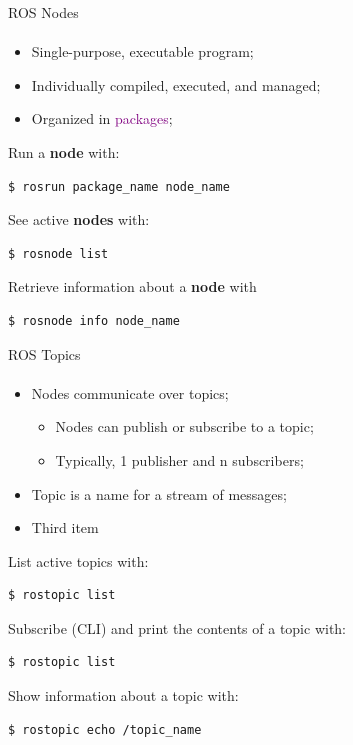 \documentclass[aspectratio=169]{beamer}
\begin{document}
\begin{frame}[fragile]{ROS Nodes}
	\framesubtitle{ }
	\begin{minipage}{0.6\textwidth}
    \begin{itemize}
        \item Single-purpose, executable program;
        \item Individually compiled, executed, and managed;
        \item Organized in \textcolor{purple}{packages};
    \end{itemize}

	Run a \textbf{node} with:
	\begin{lstlisting}[language=bash]
		$ rosrun package_name node_name
    \end{lstlisting}

	See active \textbf{nodes} with:
	\begin{lstlisting}[language=bash]
		$ rosnode list
    \end{lstlisting}

	Retrieve information about a \textbf{node} with
	\begin{lstlisting}[language=bash]
		$ rosnode info node_name
    \end{lstlisting}

\end{minipage}
\begin{minipage}{0.4\textwidth}
	
\end{minipage}
\end{frame}

\begin{frame}[fragile]{ROS Topics}
	\framesubtitle{ }
	\begin{minipage}{0.6\textwidth}
    \begin{itemize}
        \item Nodes communicate over topics;
        \begin{itemize}
			\item Nodes can publish or subscribe to a topic;
			\item Typically, 1 publisher and n subscribers;
		\end{itemize}
        \item Topic is a name for a stream of messages;
        \item Third item
    \end{itemize}
	List active topics with:
	\begin{lstlisting}[language=bash]
		$ rostopic list
    \end{lstlisting}
	Subscribe (CLI) and print the contents of a topic with:
	\begin{lstlisting}[language=bash]
		$ rostopic list
    \end{lstlisting}
	Show information about a topic with:
	\begin{lstlisting}[language=bash]
		$ rostopic echo /topic_name
    \end{lstlisting}
\end{minipage}
\begin{minipage}{0.4\textwidth}
	
\end{minipage}
\end{frame}
\end{document}
